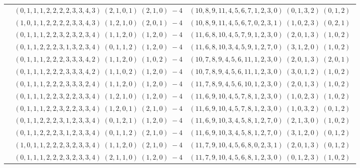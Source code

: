 \documentclass[11pt]{article}
\begin{document}
\begin{longtable}[l]{|c|c|c|}
 \cline{2-3} 
 & $(0 ,1 ,1 ,1 ,2 ,2 ,2 ,2 ,3 ,3 ,4 ,3) \;(2 ,1 ,0 ,1) \;(2 ,1 ,0) \;-4$ & $(10 ,8 ,9 ,11 ,4 ,5 ,6 ,7 ,1 ,2 ,3 ,0) \;(0 ,1 ,3 ,2) \;(0 ,1 ,2) \;$\\ 
 \cline{2-3} 
 & $(1 ,0 ,1 ,1 ,2 ,2 ,2 ,2 ,3 ,3 ,4 ,3) \;(1 ,2 ,1 ,0) \;(2 ,0 ,1) \;-4$ & $(10 ,8 ,9 ,11 ,4 ,5 ,6 ,7 ,0 ,2 ,3 ,1) \;(1 ,0 ,2 ,3) \;(0 ,2 ,1) \;$\\ 
 \cline{2-3} 
 & $(0 ,1 ,1 ,1 ,2 ,2 ,3 ,2 ,3 ,2 ,3 ,4) \;(1 ,1 ,2 ,0) \;(1 ,2 ,0) \;-4$ & $(11 ,6 ,8 ,10 ,4 ,5 ,7 ,9 ,1 ,2 ,3 ,0) \;(2 ,0 ,1 ,3) \;(1 ,0 ,2) \;$\\ 
 \cline{2-3} 
 & $(0 ,1 ,1 ,2 ,2 ,2 ,3 ,1 ,3 ,2 ,3 ,4) \;(0 ,1 ,1 ,2) \;(1 ,2 ,0) \;-4$ & $(11 ,6 ,8 ,10 ,3 ,4 ,5 ,9 ,1 ,2 ,7 ,0) \;(3 ,1 ,2 ,0) \;(1 ,0 ,2) \;$\\ 
 \cline{2-3} 
 & $(0 ,1 ,1 ,1 ,2 ,2 ,2 ,3 ,3 ,3 ,4 ,2) \;(1 ,1 ,2 ,0) \;(1 ,0 ,2) \;-4$ & $(10 ,7 ,8 ,9 ,4 ,5 ,6 ,11 ,1 ,2 ,3 ,0) \;(2 ,0 ,1 ,3) \;(2 ,0 ,1) \;$\\ 
 \cline{2-3} 
 & $(0 ,1 ,1 ,1 ,2 ,2 ,2 ,3 ,3 ,3 ,4 ,2) \;(1 ,1 ,0 ,2) \;(1 ,2 ,0) \;-4$ & $(10 ,7 ,8 ,9 ,4 ,5 ,6 ,11 ,1 ,2 ,3 ,0) \;(3 ,0 ,1 ,2) \;(1 ,0 ,2) \;$\\ 
 \cline{2-3} 
 & $(0 ,1 ,1 ,1 ,2 ,2 ,2 ,3 ,3 ,3 ,2 ,4) \;(1 ,1 ,2 ,0) \;(1 ,2 ,0) \;-4$ & $(11 ,7 ,8 ,9 ,4 ,5 ,6 ,10 ,1 ,2 ,3 ,0) \;(2 ,0 ,1 ,3) \;(1 ,0 ,2) \;$\\ 
 \cline{2-3} 
 & $(0 ,1 ,1 ,1 ,2 ,2 ,3 ,2 ,2 ,3 ,3 ,4) \;(1 ,2 ,1 ,0) \;(1 ,2 ,0) \;-4$ & $(11 ,6 ,9 ,10 ,4 ,5 ,7 ,8 ,1 ,2 ,3 ,0) \;(1 ,0 ,2 ,3) \;(1 ,0 ,2) \;$\\ 
 \cline{2-3} 
 & $(0 ,1 ,1 ,1 ,2 ,2 ,3 ,2 ,2 ,3 ,3 ,4) \;(1 ,2 ,0 ,1) \;(2 ,1 ,0) \;-4$ & $(11 ,6 ,9 ,10 ,4 ,5 ,7 ,8 ,1 ,2 ,3 ,0) \;(1 ,0 ,3 ,2) \;(0 ,1 ,2) \;$\\ 
 \cline{2-3} 
 & $(0 ,1 ,1 ,2 ,2 ,2 ,3 ,1 ,2 ,3 ,3 ,4) \;(0 ,1 ,2 ,1) \;(1 ,2 ,0) \;-4$ & $(11 ,6 ,9 ,10 ,3 ,4 ,5 ,8 ,1 ,2 ,7 ,0) \;(2 ,1 ,3 ,0) \;(1 ,0 ,2) \;$\\ 
 \cline{2-3} 
 & $(0 ,1 ,1 ,2 ,2 ,2 ,3 ,1 ,2 ,3 ,3 ,4) \;(0 ,1 ,1 ,2) \;(2 ,1 ,0) \;-4$ & $(11 ,6 ,9 ,10 ,3 ,4 ,5 ,8 ,1 ,2 ,7 ,0) \;(3 ,1 ,2 ,0) \;(0 ,1 ,2) \;$\\ 
 \cline{2-3} 
 & $(1 ,0 ,1 ,1 ,2 ,2 ,2 ,3 ,2 ,3 ,3 ,4) \;(1 ,1 ,2 ,0) \;(2 ,1 ,0) \;-4$ & $(11 ,7 ,9 ,10 ,4 ,5 ,6 ,8 ,0 ,2 ,3 ,1) \;(2 ,0 ,1 ,3) \;(0 ,1 ,2) \;$\\ 
 \cline{2-3} 
 & $(0 ,1 ,1 ,1 ,2 ,2 ,2 ,3 ,2 ,3 ,3 ,4) \;(2 ,1 ,1 ,0) \;(1 ,2 ,0) \;-4$ & $(11 ,7 ,9 ,10 ,4 ,5 ,6 ,8 ,1 ,2 ,3 ,0) \;(0 ,1 ,2 ,3) \;(1 ,0 ,2) \;$\\ 

\end{longtable}
\end{document}
